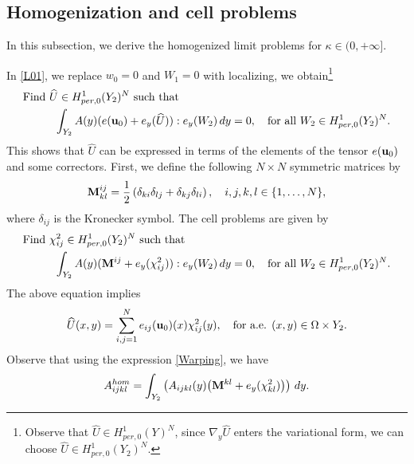 \documentclass[11pt,a4paper]{article}
\numberwithin{equation}{section}
\def\O{\Omega}
\def\d{\delta}
\def\wh{\widehat }
\def\X{\times }
\def\Gu{{\bf u}}
\def\GM{{\bf M}}
\begin{document}
\subsection{Homogenization and cell problems}\label{SS44}
In this subsection, we derive the homogenized limit problems for $\kappa\in(0,+\infty]$.

In \eqref{L01}, we replace $w_0=0$ and $W_1=0$ with localizing, we obtain\footnote{Observe that $\wh U\in H^1_{per,0}(Y)^N$, since $\nabla_y\wh U$ enters the variational form, we can choose $\wh U\in H^1_{per,0}(Y_2)^N$.}
\begin{equation}\label{514}
	\begin{aligned}
		&\text{Find $\wh U\in H^1_{per,0}(Y_2)^N$ such that}\\
		&\hskip 10mm \int_{Y_2}A(y)(e(\Gu_0)+e_y(\wh U)):e_y(W_2)\,dy=0,\quad\text{for all $W_2\in H^1_{per,0}(Y_2)^N$}.
	\end{aligned}
\end{equation}
This shows that $\wh U$ can be expressed in terms of the elements of the tensor $e(\Gu_0)$ and some correctors. First, we define the following $N\X N$ symmetric matrices by
$$\GM^{ij}_{kl}={1\over 2}\left(\d_{ki}\d_{lj}+\d_{kj}\d_{li}\right),\quad i,j,k,l\in\{1,\dots, N\},$$
where $\d_{ij}$ is the Kronecker symbol. The cell problems are given by
\begin{equation*}
	\begin{aligned}
		&\text{Find $\chi^2_{ij}\in H^1_{per,0}(Y_2)^N$ such that}\\
		&\hskip 10mm \int_{Y_2} A(y)(\GM^{ij}+e_y(\chi^2_{ij})):e_y(W_2)\,dy=0,\quad\text{for all $W_2\in H^1_{per,0}(Y_2)^N$}.
	\end{aligned}
\end{equation*}
The above equation implies
\begin{equation}\label{Warping}
	\wh U(x,y)=\sum_{i,j=1}^N e_{ij}(\Gu_0)(x)\chi^2_{ij}(y),\quad\text{for a.e. $(x,y)\in \O\X Y_2$}.
\end{equation}
Observe that using the expression \eqref{Warping}, we have
\begin{equation}\label{Hom01}
	A^{hom}_{ijkl}=\int_{Y_2}\left(A_{ijkl}(y)\big(\GM^{kl}+e_y(\chi^2_{kl})\big)\right)\,dy.
\end{equation}
\end{document}

